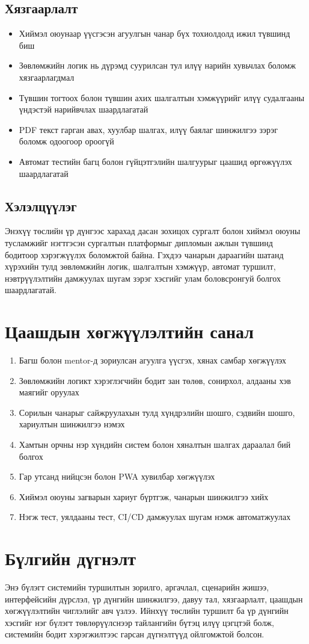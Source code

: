 \subsection{Хязгаарлалт}
\begin{itemize}
\item Хиймэл оюунаар үүсгэсэн агуулгын чанар бүх тохиолдолд ижил түвшинд биш
\item Зөвлөмжийн логик нь дүрэмд суурилсан тул илүү нарийн хувьчлах боломж хязгаарлагдмал
\item Түвшин тогтоох болон түвшин ахих шалгалтын хэмжүүрийг илүү судалгааны үндэстэй нарийвчлах шаардлагатай
\item PDF текст гарган авах, хуулбар шалгах, илүү баялаг шинжилгээ зэрэг боломж одоогоор ороогүй
\item Автомат тестийн багц болон гүйцэтгэлийн шалгуурыг цаашид өргөжүүлэх шаардлагатай
\end{itemize}

\subsection{Хэлэлцүүлэг}
Энэхүү төслийн үр дүнгээс харахад дасан зохицох сургалт болон хиймэл оюуны тусламжийг нэгтгэсэн сургалтын платформыг дипломын ажлын түвшинд бодитоор хэрэгжүүлэх боломжтой байна. Гэхдээ чанарын дараагийн шатанд хүрэхийн тулд зөвлөмжийн логик, шалгалтын хэмжүүр, автомат туршилт, нэвтрүүлэлтийн дамжуулах шугам зэрэг хэсгийг улам боловсронгуй болгох шаардлагатай.

\section{Цаашдын хөгжүүлэлтийн санал}
\begin{enumerate}
\item Багш болон mentor-д зориулсан агуулга үүсгэх, хянах самбар хөгжүүлэх
\item Зөвлөмжийн логикт хэрэглэгчийн бодит зан төлөв, сонирхол, алдааны хэв маягийг оруулах
\item Сорилын чанарыг сайжруулахын тулд хүндрэлийн шошго, сэдвийн шошго, хариултын шинжилгээ нэмэх
\item Хамтын орчны нэр хүндийн систем болон хяналтын шалгах дараалал бий болгох
\item Гар утсанд нийцсэн болон PWA хувилбар хөгжүүлэх
\item Хиймэл оюуны загварын хариуг бүртгэж, чанарын шинжилгээ хийх
\item Нэгж тест, уялдааны тест, CI/CD дамжуулах шугам нэмж автоматжуулах
\end{enumerate}

\section{Бүлгийн дүгнэлт}
Энэ бүлэгт системийн туршилтын зорилго, аргачлал, сценарийн жишээ, интерфейсийн дүрслэл, үр дүнгийн шинжилгээ, давуу тал, хязгаарлалт, цаашдын хөгжүүлэлтийн чиглэлийг авч үзлээ. Ийнхүү төслийн туршилт ба үр дүнгийн хэсгийг нэг бүлэгт төвлөрүүлснээр тайлангийн бүтэц илүү цэгцтэй болж, системийн бодит хэрэгжилтээс гарсан дүгнэлтүүд ойлгомжтой болсон.

